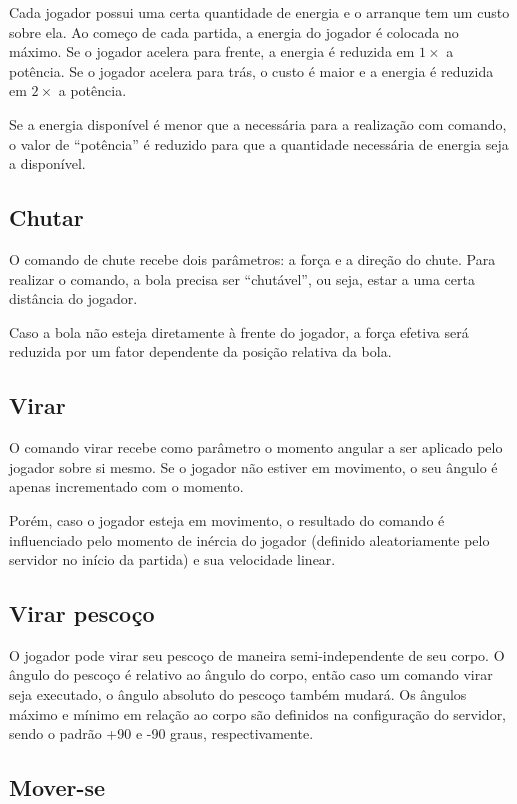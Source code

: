 Cada jogador possui uma certa quantidade de energia e o arranque tem um custo sobre ela. Ao começo de cada partida, a energia do jogador é colocada no máximo. Se o jogador acelera para frente, a energia é reduzida em $1\times$ a potência. Se o jogador acelera para trás, o custo é maior e a energia é reduzida em $2\times$ a potência.

Se a energia disponível é menor que a necessária para a realização com comando, o valor de ``potência'' é reduzido para que a quantidade necessária de energia seja a disponível.

\subsection{Chutar}

O comando de chute recebe dois parâmetros: a força e a direção do chute. Para realizar o comando, a bola precisa ser ``chutável'', ou seja, estar a uma certa distância do jogador.

Caso a bola não esteja diretamente à frente do jogador, a força efetiva será reduzida por um fator dependente da posição relativa da bola.

\subsection{Virar}

O comando virar recebe como parâmetro o momento angular a ser aplicado pelo jogador sobre si mesmo. Se o jogador não estiver em movimento, o seu ângulo é apenas incrementado com o momento.

Porém, caso o jogador esteja em movimento, o resultado do comando é influenciado pelo momento de inércia do jogador (definido aleatoriamente pelo servidor no início da partida) e sua velocidade linear.

\subsection{Virar pescoço}

O jogador pode virar seu pescoço de maneira semi-independente de seu corpo. O ângulo do pescoço é relativo ao ângulo do corpo, então caso um comando virar seja executado, o ângulo absoluto do pescoço também mudará. Os ângulos máximo e mínimo em relação ao corpo são definidos na configuração do servidor, sendo o padrão +90 e -90 graus, respectivamente.

\subsection{Mover-se}
\label{sec:move}

